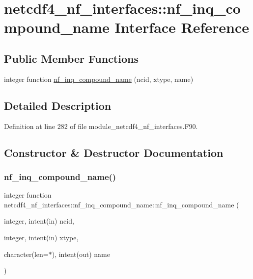 \hypertarget{interfacenetcdf4__nf__interfaces_1_1nf__inq__compound__name}{}\section{netcdf4\+\_\+nf\+\_\+interfaces\+:\+:nf\+\_\+inq\+\_\+compound\+\_\+name Interface Reference}
\label{interfacenetcdf4__nf__interfaces_1_1nf__inq__compound__name}
\subsection*{Public Member Functions}
\begin{DoxyCompactItemize}
\item 
integer function \hyperlink{interfacenetcdf4__nf__interfaces_1_1nf__inq__compound__name_ac2b89258d53f211aa6d05d5e2425db14}{nf\+\_\+inq\+\_\+compound\+\_\+name} (ncid, xtype, name)
\end{DoxyCompactItemize}


\subsection{Detailed Description}


Definition at line 282 of file module\+\_\+netcdf4\+\_\+nf\+\_\+interfaces.\+F90.



\subsection{Constructor \& Destructor Documentation}
\mbox{\label{interfacenetcdf4__nf__interfaces_1_1nf__inq__compound__name_ac2b89258d53f211aa6d05d5e2425db14}} 
\subsubsection{\texorpdfstring{nf\+\_\+inq\+\_\+compound\+\_\+name()}{nf\_inq\_compound\_name()}}
{\footnotesize\ttfamily integer function netcdf4\+\_\+nf\+\_\+interfaces\+::nf\+\_\+inq\+\_\+compound\+\_\+name\+::nf\+\_\+inq\+\_\+compound\+\_\+name (\begin{DoxyParamCaption}\item[{integer, intent(in)}]{ncid,  }\item[{integer, intent(in)}]{xtype,  }\item[{character(len=$\ast$), intent(out)}]{name }\end{DoxyParamCaption})}



